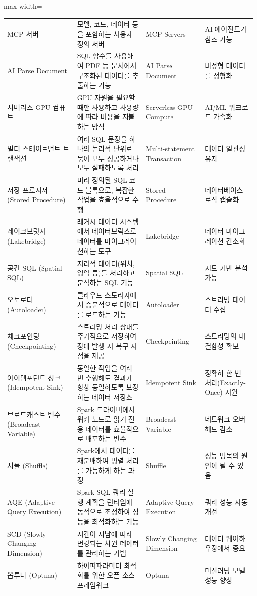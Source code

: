\documentclass[11pt,a4paper]{article}
\theoremstyle{definition}
\begin{document}
\begin{adjustbox}{max width=\textwidth}
\begin{tabular}{llll}
MCP 서버 & 모델, 코드, 데이터 등을 포함하는 사용자 정의 서버 & MCP Servers & AI 에이전트가 참조 가능 \\
AI Parse Document & SQL 함수를 사용하여 PDF 등 문서에서 구조화된 데이터를 추출하는 기능 & AI Parse Document & 비정형 데이터를 정형화 \\
서버리스 GPU 컴퓨트 & GPU 자원을 필요할 때만 사용하고 사용량에 따라 비용을 지불하는 방식 & Serverless GPU Compute & AI/ML 워크로드 가속화 \\
멀티 스테이트먼트 트랜잭션 & 여러 SQL 문장을 하나의 논리적 단위로 묶어 모두 성공하거나 모두 실패하도록 처리 & Multi-statement Transaction & 데이터 일관성 유지 \\
저장 프로시저 (Stored Procedure) & 미리 정의된 SQL 코드 블록으로, 복잡한 작업을 효율적으로 수행 & Stored Procedure & 데이터베이스 로직 캡슐화 \\
레이크브릿지 (Lakebridge) & 레거시 데이터 시스템에서 데이터브릭스로 데이터를 마이그레이션하는 도구 & Lakebridge & 데이터 마이그레이션 간소화 \\
공간 SQL (Spatial SQL) & 지리적 데이터(위치, 영역 등)를 처리하고 분석하는 SQL 기능 & Spatial SQL & 지도 기반 분석 가능 \\
오토로더 (Autoloader) & 클라우드 스토리지에서 증분적으로 데이터를 로드하는 기능 & Autoloader & 스트리밍 데이터 수집 \\
체크포인팅 (Checkpointing) & 스트리밍 처리 상태를 주기적으로 저장하여 장애 발생 시 복구 지점을 제공 & Checkpointing & 스트리밍의 내결함성 확보 \\
아이뎀포턴트 싱크 (Idempotent Sink) & 동일한 작업을 여러 번 수행해도 결과가 항상 동일하도록 보장하는 데이터 저장소 & Idempotent Sink & 정확히 한 번 처리(Exactly-Once) 지원 \\
브로드캐스트 변수 (Broadcast Variable) & Spark 드라이버에서 워커 노드로 읽기 전용 데이터를 효율적으로 배포하는 변수 & Broadcast Variable & 네트워크 오버헤드 감소 \\
셔플 (Shuffle) & Spark에서 데이터를 재분배하여 병렬 처리를 가능하게 하는 과정 & Shuffle & 성능 병목의 원인이 될 수 있음 \\
AQE (Adaptive Query Execution) & Spark SQL 쿼리 실행 계획을 런타임에 동적으로 조정하여 성능을 최적화하는 기능 & Adaptive Query Execution & 쿼리 성능 자동 개선 \\
SCD (Slowly Changing Dimension) & 시간이 지남에 따라 변경되는 차원 데이터를 관리하는 기법 & Slowly Changing Dimension & 데이터 웨어하우징에서 중요 \\
옵투나 (Optuna) & 하이퍼파라미터 최적화를 위한 오픈 소스 프레임워크 & Optuna & 머신러닝 모델 성능 향상 \\

\end{tabular}
\end{adjustbox}
\end{document}
